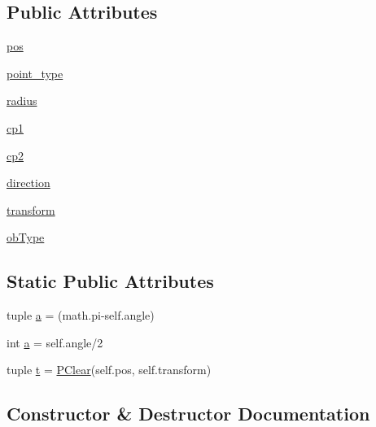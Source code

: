 \subsection*{Public Attributes}
\begin{DoxyCompactItemize}
\item 
\hyperlink{classpoint_1_1_p_sharp_a9787083a24ff63bac9811134b2745ac1}{pos}
\item 
\hyperlink{classpoint_1_1_p_sharp_a48bcd12ae60304ad485a57aa30508055}{point\+\_\+type}
\item 
\hyperlink{classpoint_1_1_p_sharp_a7c2aab94ed972ccba83e761b4e2e8798}{radius}
\item 
\hyperlink{classpoint_1_1_p_sharp_aa5b16dd2ff9364241eb57b1eef00a4bf}{cp1}
\item 
\hyperlink{classpoint_1_1_p_sharp_aa8410ba181e860207e23e7f65808dc5a}{cp2}
\item 
\hyperlink{classpoint_1_1_p_sharp_a80d49050d431b2469e4052e0e85c05e7}{direction}
\item 
\hyperlink{classpoint_1_1_p_sharp_a0cdbf01fff6be3360181828a5e3a5dd0}{transform}
\item 
\hyperlink{classpoint_1_1_p_sharp_adbdd89730398e84df13fe635506ef1f1}{ob\+Type}
\end{DoxyCompactItemize}
\subsection*{Static Public Attributes}
\begin{DoxyCompactItemize}
\item 
tuple \hyperlink{classpoint_1_1_p_sharp_ac1fa66d2deea6b3f0154f9ba70980eb4}{a} = (math.\+pi-\/self.\+angle)
\item 
int \hyperlink{classpoint_1_1_p_sharp_ab005edba0b9fe808530c844abe8b66f9}{a} = self.\+angle/2
\item 
tuple \hyperlink{classpoint_1_1_p_sharp_a42fca1df07d32aee57457b554d9cff1c}{t} = \hyperlink{classpoint_1_1_p_clear}{P\+Clear}(self.\+pos, self.\+transform)
\end{DoxyCompactItemize}


\subsection{Constructor \& Destructor Documentation}
\hypertarget{classpoint_1_1_p_sharp_af1afffea36431e34b401c9309cc9ecdd}{}
